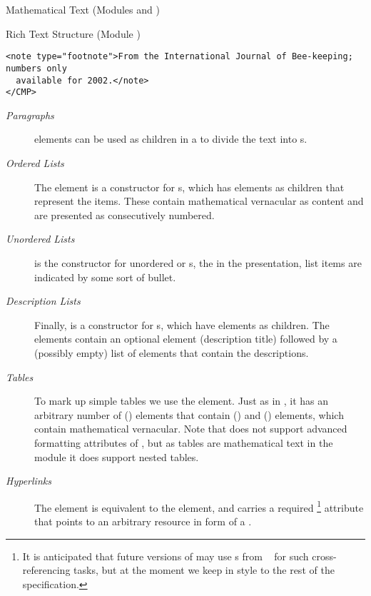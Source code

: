 \begin{tchapter}[id=mtxt,short=Mathematical Text]{Mathematical Text (Modules
  {} and {})}
\begin{tsection}[id=rt,short=Rich Text Structure]{Rich Text Structure (Module {})}
\begin{lstlisting}[label=lst:richtext,
   caption={An Example of Rich Text Structure},
   index={CMP,ul,li,phrase,link}]
  <note type="footnote">From the International Journal of Bee-keeping; numbers only
  available for 2002.</note> 
</CMP>
\end{lstlisting}
\begin{description}
\item[\emph{Paragraphs}] {} elements can be used as children in
  a {} to divide the text into {s}.
\item[\emph{Ordered Lists}] The {} element is a constructor
  for {s}, which has {} elements as children that
  represent the items. These contain mathematical vernacular as content and are presented
  as consecutively numbered.
\item[\emph{Unordered Lists}] {} is the constructor for
  unordered or {s}, the in the presentation,
  list items are indicated by some sort of bullet.
\item[\emph{Description Lists}] Finally, {} is a
  constructor for {s}, which have {} elements as
  children. The {} elements contain an optional {} element
  (description title) followed by a (possibly empty) list of {} elements that
  contain the descriptions.
\item[\emph{Tables}] To mark up simple tables we use the {}
  element. Just as in {\xhtml}, it has an arbitrary number of {}
  ({}) elements that contain {} ({})
  and {} ({}) elements, which contain mathematical
  vernacular.  Note that {\omdoc} does not support advanced formatting attributes of
  {\xhtml}, but as tables are mathematical text in the module {} it does
  support nested tables.
\item[\emph{Hyperlinks}] The {} element is equivalent to the
  {\xhtml} {} element, and carries a required
  {}\footnote{It is anticipated that future versions of {\omdoc} may
    use {s} from {}~\cite{DeRMal:xlink01} for such
    cross-referencing tasks, but at the moment we keep in style to
    the rest of the specification.}  attribute that points to an arbitrary resource in
  form of a {}.

\end{description}
\end{tsection}
\end{tchapter}
